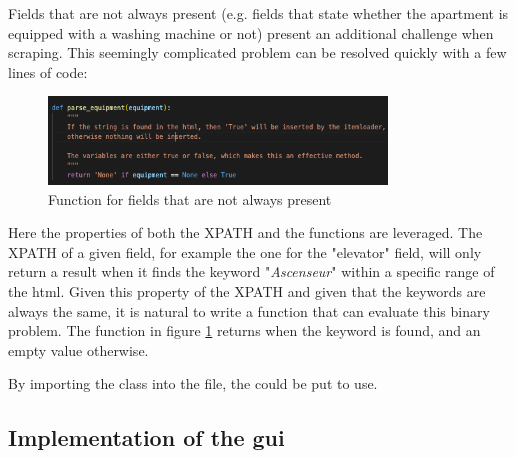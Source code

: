 \documentclass[main]{subfiles}
\begin{document}
Fields that are not always present
(e.g. fields that state whether the apartment is equipped with a washing machine or not)
present an additional challenge  when scraping.
This seemingly complicated problem can be resolved quickly with a few lines of code:

\begin{figure}[htbp]
    \centerline{
        \includegraphics[width = 90mm]{prog_6.png}}
    \caption{Function for fields that are not always present}
    \label{fig:ispresentornot}
\end{figure}

Here the properties of both the XPATH and the functions are leveraged.
The XPATH of a given field, for example the one for the "elevator" field, 
will only return a result when it finds the keyword "\textit{Ascenseur}" within a specific range of the \acs*{html}.
Given this property of the XPATH and given that the keywords are always the same, 
it is natural to write a function that can evaluate this binary problem.
The function in figure \ref{fig:ispresentornot} returns \pkg[True] when the keyword is found,
and an empty value \pkg[(N/A)] otherwise.

By importing the class \pkg[ComparisWebscraperItem] into the  file, the \pkg[ItemLoader] 
could be put to use.

\subsection{Implementation of the \ac{gui}}
\end{document}
